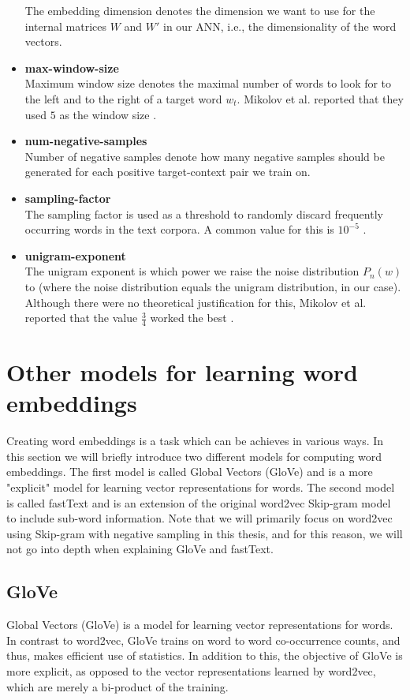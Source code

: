 \begin{itemize}
        The embedding dimension denotes the dimension we want to use for the internal matrices $W$ and $W'$ in our ANN, i.e., the dimensionality of the word vectors.
    \item \textbf{max-window-size} \\
        Maximum window size denotes the maximal number of words to look for to the left and to the right of a target word $w_t$. Mikolov et al. reported that they used $5$ as the window size \cite{mikolov2013b}.
    \item \textbf{num-negative-samples} \\
        Number of negative samples denote how many negative samples should be generated for each positive target-context pair we train on.
    \item \textbf{sampling-factor} \\
        The sampling factor is used as a threshold to randomly discard frequently occurring words in the text corpora. A common value for this is $10^{-5}$ \cite{mikolov2013b}.
    \item \textbf{unigram-exponent} \\
        The unigram exponent is which power we raise the noise distribution $P_n(w)$ to (where the noise distribution equals the unigram distribution, in our case). Although there were no theoretical justification for this, Mikolov et al. reported that the value $\frac{3}{4}$ worked the best \cite{mikolov2013b}.
\end{itemize}

\section{Other models for learning word embeddings}
Creating word embeddings is a task which can be achieves in various ways. In this section we will briefly introduce two different models for computing word embeddings. The first model is called Global Vectors (GloVe) \cite{pennington2014glove} and is a more "explicit" model for learning vector representations for words. The second model is called fastText \cite{bojanowski2017enriching} and is an extension of the original word2vec Skip-gram model to include sub-word information. Note that we will primarily focus on word2vec using Skip-gram with negative sampling in this thesis, and for this reason, we will not go into depth when explaining GloVe and fastText.

\subsection{GloVe}
Global Vectors (GloVe) \cite{pennington2014glove} is a model for learning vector representations for words. In contrast to word2vec, GloVe trains on word to word co-occurrence counts, and thus, makes efficient use of statistics. In addition to this, the objective of GloVe is more explicit, as opposed to the vector representations learned by word2vec, which are merely a bi-product of the training.

